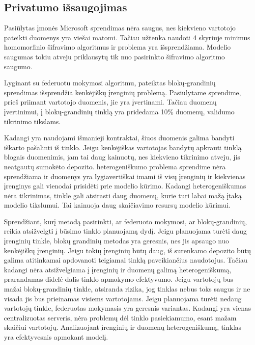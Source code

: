 \documentclass{VUMIFInfBakalaurinis}
\begin{document}
\subsection{Privatumo išsaugojimas}	
\par Pasiūlytas įmonės Microsoft sprendimas nėra saugus, nes kiekvieno vartotojo pateikti duomenys yra viešai matomi. Tačiau užtenka naudoti 4 skyriuje minimus homomorfinio šifravimo algoritmus ir problema yra išsprendžiama. Modelio saugumas tokiu atveju priklausytų tik nuo pasirinkto šifravimo algoritmo saugumo.
\par Lyginant su federuotu mokymosi algoritmu, pateiktas blokų-grandinių sprendimas išsprendžia kenkėjiškų įrenginių problemą. Pasiūlytame sprendime, prieš priimant vartotojo duomenis, jie yra įvertinami. Tačiau duomenų įvertinimui, į blokų-grandinių tinklą yra pridedama 10\% duomenų, validumo tikrinimo tikslams. \par Kadangi yra naudojami išmanieji kontraktai, šiuos duomenis galima bandyti iškarto pašalinti iš tinklo. Jeigu kenkėjiškas vartotojas bandytų apkrauti tinklą blogais duomenimis, jam tai daug kainuotų, nes kiekvieno tikrinimo atveju, jis neatgautų sumokėto depozito.
 heterogeniškumo problema sprendime nėra sprendžiama ir duomenys yra lygiavertiškai imami iš visų įrenginių ir kiekvienas įrenginys gali vienodai prisidėti prie modelio kūrimo. Kadangi heterogeniškumas nėra tikrinimas, tinkle gali atsirasti daug duomenų, kurie turi labai mažą įtaką modelio tikslumui. Tai kainuoja daug skaičiavimo resursų modelio kūrimui.
\par Sprendžiant, kurį metodą pasirinkti, ar federuoto mokymosi, ar blokų-grandinių, reikia atsižvelgti į būsimo tinklo planuojamą dydį. Jeigu planuojama turėti daug įrenginių tinkle, blokų grandinių metodas yra geresnis, nes jis apsaugo nuo kenkėjiškų įrenginių. Jeigu tokių įrenginių būtų daug, iš surenkamo depozito būtų galima atitinkamai apdovanoti teigiamai tinklą paveikiančius naudotojus. Tačiau kadangi nėra atsižvelgiama į įrenginių ir duomenų galimą heterogeniškumą, prarandamas didelė dalis tinklo apmokymo efektyvumo. Jeigu vartotojų bus mažai blokų-grandinių tinkle, atsiranda rizika, jog tinklas nebus toks saugus ir ne visada jis bus prieinamas visiems vartotojams. Jeigu planuojama turėti nedaug vartotojų tinkle, federuotas mokymasis yra geresnis variantas. Kadangi yra vienas centralizuotas serveris, nėra problemų dėl tinklo pasiekiamumo, esant mažam skaičiui vartotojų. Analizuojant įrenginių ir duomenų heterogeniškumą, tinklas yra efektyvesnis apmokant modelį.  
\end{document}
